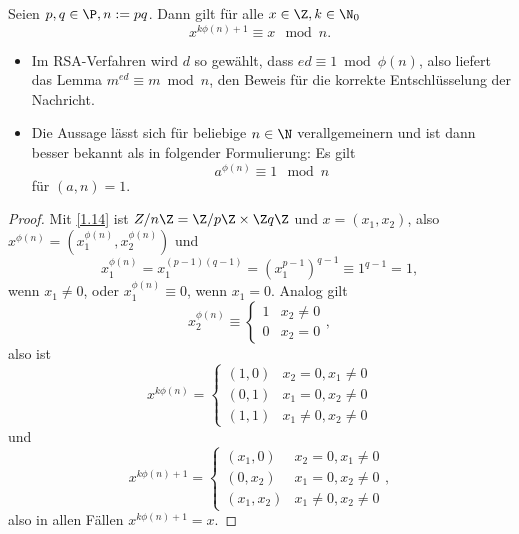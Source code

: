 \setcounter{thm}{1}
\begin{lem} \label{3.2}
	Seien $p, q \in \P, n := pq$.
	Dann gilt für alle $x \in \Z, k \in \N_0$
	\[
		x^{k\phi(n) + 1} \equiv x \mod n.
	\]
	\begin{note}
		\begin{itemize}
			\item
				Im RSA-Verfahren wird $d$ so gewählt, dass $ed \equiv 1 \bmod \phi(n)$, also liefert das Lemma $m^{ed} \equiv m \bmod n$, den Beweis für die korrekte Entschlüsselung der Nachricht.
			\item
				Die Aussage lässt sich für beliebige $n \in \N$ verallgemeinern und ist dann besser bekannt als  in folgender Formulierung: Es gilt
				\[
					a^{\phi(n)} \equiv 1 \mod n
				\]
				für $(a, n) = 1$.
		\end{itemize}
	\end{note}
	\begin{proof}
		Mit \ref{1.14} ist $Z / n\Z = \Z /p\Z \times \Z q\Z$ und $x = (x_1, x_2)$, also $x^{\phi(n)} = (x_1^{\phi(n)}, x_2^{\phi(n)})$ und
		\[
			x_1^{\phi(n)}
			= x_1^{(p-1)(q-1)}
			= (x_1^{p-1})^{q-1}
			\equiv 1^{q-1}
			= 1,
		\]
		wenn $x_1 \neq 0$, oder $x_1^{\phi(n)} \equiv 0$, wenn $x_1 = 0$.
		Analog gilt
		\[
			x_2^{\phi(n)} \equiv \begin{cases}
				1 & x_2 \neq 0 \\
				0 & x_2 = 0
			\end{cases},
		\]
		also ist
		\[
			x^{k\phi(n)} = \begin{cases}
				(1, 0) & x_2=0, x_1 \neq 0 \\
				(0,1) & x_1=0, x_2 \neq 0 \\
				(1,1) & x_1\neq 0, x_2 \neq 0
			\end{cases}
		\]
		und
		\[
			x^{k\phi(n) + 1} = \begin{cases}
				(x_1, 0) & x_2=0, x_1 \neq 0 \\
				(0,x_2) & x_1=0, x_2 \neq 0 \\
				(x_1,x_2) & x_1\neq 0, x_2 \neq 0
			\end{cases},
		\]
		also in allen Fällen $x^{k\phi(n) + 1} = x$.
	\end{proof}
\end{lem}

